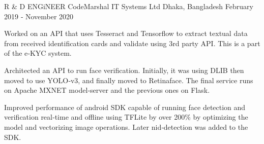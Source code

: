 \cventry
    {R \& D ENGiNEER }
    {CodeMarshal IT Systems Ltd}
    {Dhaka, Bangladesh}
    {February 2019 ‑ November 2020}
    {
      \begin{cvitems}
        \item {Worked on an API that uses Tesseract and Tensorflow to extract textual data from received identification cards and validate using 3rd party API. This is a part of the e‑KYC system.}
        \item {Architected an API to run face verification. Initially, it was using DLIB then moved to use YOLO‑v3, and finally moved to Retinaface. The final service runs on Apache MXNET model‑server and the previous ones on Flask.}
        \item {Improved performance of android SDK capable of running face detection and verification real‑time and offline using TFLite by over 200\% by optimizing the model and vectorizing image operations. Later nid‑detection was added to the SDK.}
      \end{cvitems}
    }